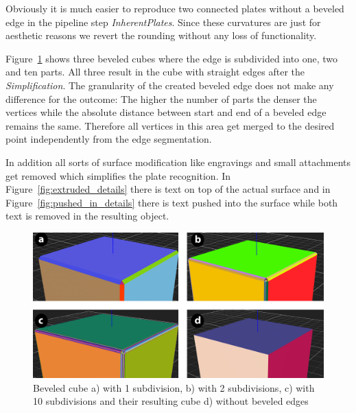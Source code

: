 \documentclass[../ClassicThesis.tex]{subfiles}
\begin{document}
Obviously it is much easier to reproduce two connected plates without a beveled edge in the pipeline step \emph{InherentPlates}. Since these curvatures are just for aesthetic reasons we revert the rounding without any loss of functionality.

Figure~\ref{fig:beveled} shows three beveled cubes where the edge is subdivided into one, two and ten parts. All three result in the cube with straight edges after the \emph{Simplification}. The granularity of the created beveled edge does not make any difference for the outcome:
The higher the number of parts the denser the vertices while the absolute distance between start and end of a beveled edge remains the same. Therefore all vertices in this area get merged to the desired point independently from the edge segmentation.

In addition all sorts of surface modification like engravings and small attachments get removed which simplifies the plate recognition. In Figure~\ref{fig:extruded_details} there is text on top of the actual surface and in Figure~\ref{fig:pushed_in_details} there is text pushed into the surface while both text is removed in the resulting object.


\begin{figure}
\includegraphics[width=1.0\columnwidth]{Images/04-approx-welding-beveled-2.png}
\caption{Beveled cube a) with 1 subdivision, b) with 2 subdivisions, c) with 10 subdivisions and their resulting cube d) without beveled edges}
\label{fig:beveled}
\end{figure}
\end{document}
